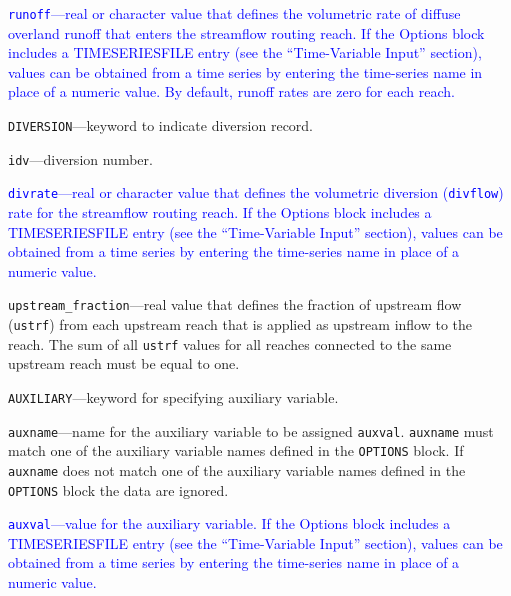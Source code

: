 \begin{description}
\item \textcolor{blue}{\texttt{runoff}---real or character value that defines the volumetric rate of diffuse overland runoff that enters the streamflow routing reach. If the Options block includes a TIMESERIESFILE entry (see the ``Time-Variable Input'' section), values can be obtained from a time series by entering the time-series name in place of a numeric value. By default, runoff rates are zero for each reach.}

\item \texttt{DIVERSION}---keyword to indicate diversion record.

\item \texttt{idv}---diversion number.

\item \textcolor{blue}{\texttt{divrate}---real or character value that defines the volumetric diversion (\texttt{divflow}) rate for the streamflow routing reach. If the Options block includes a TIMESERIESFILE entry (see the ``Time-Variable Input'' section), values can be obtained from a time series by entering the time-series name in place of a numeric value.}

\item \texttt{upstream\_fraction}---real value that defines the fraction of upstream flow (\texttt{ustrf}) from each upstream reach that is applied as upstream inflow to the reach. The sum of all \texttt{ustrf} values for all reaches connected to the same upstream reach must be equal to one.

\item \texttt{AUXILIARY}---keyword for specifying auxiliary variable.

\item \texttt{auxname}---name for the auxiliary variable to be assigned \texttt{auxval}.  \texttt{auxname} must match one of the auxiliary variable names defined in the \texttt{OPTIONS} block. If \texttt{auxname} does not match one of the auxiliary variable names defined in the \texttt{OPTIONS} block the data are ignored.

\item \textcolor{blue}{\texttt{auxval}---value for the auxiliary variable.  If the Options block includes a TIMESERIESFILE entry (see the ``Time-Variable Input'' section), values can be obtained from a time series by entering the time-series name in place of a numeric value.}

\end{description}

